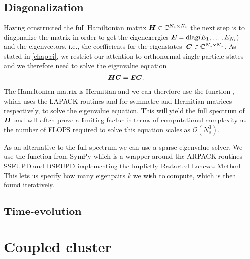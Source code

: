         \subsection{Diagonalization}
            Having constructed the full Hamiltonian matrix $\boldsymbol{H} \in
            \mathbb{C}^{N_s \times N_s}$ the next step is to diagonalize the
            matrix in order to get the eigenenergies $\boldsymbol{E} = \operatorname{diag}(E_1,
            \dots, E_{N_s})$ and the eigenvectors, i.e., the coefficients for
            the eigenstates, $\boldsymbol{C} \in \mathbb{C}^{N_s \times N_s}$.
            As stated in \autoref{chap:ci}, we restrict our attention to
            orthonormal single-particle states and we therefore need to solve
            the eigenvalue equation
            \begin{align}
                \boldsymbol{H}\boldsymbol{C} = \boldsymbol{E}\boldsymbol{C}.
            \end{align}
            The Hamiltonian matrix is Hermitian and we can therefore use the
            function  \cite{numpy}, which uses the
            LAPACK-routines \cite{laug}  and  for
            symmetrc and Hermitian matrices respectively, to solve the
            eigenvalue equation.
            This will yield the full spectrum of $\boldsymbol{H}$ and will often
            prove a limiting factor in terms of computational complexity as the
            number of FLOPS required to solve this equation scales as
            $\mathcal{O}(N_s^3)$.

            As an alternative to the full spectrum we can use a sparse
            eigenvalue solver.
            We use the function  from SymPy
            \cite{sympy} which is a wrapper around the ARPACK routines SSEUPD
            and DSEUPD \cite{arpack} implementing the Implictly Restarted
            Lanczos Method.
            This lets us specify how many eigenpairs $k$ we wish to compute,
            which is then found iteratively.

        \subsection{Time-evolution}

    \section{Coupled cluster}
